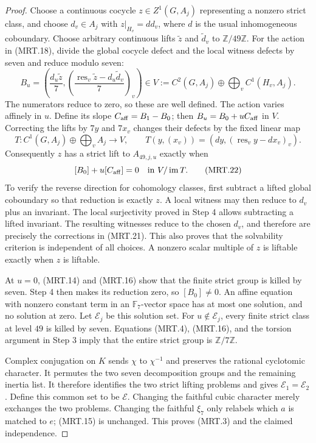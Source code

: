 \begin{proof}
Choose a continuous cocycle $z\in Z^1(G,A_j)$ representing a
nonzero strict class, and choose $d_v\in A_j$ with
$z|_{H_v}=d d_v$, where $d$ is the usual inhomogeneous coboundary.
Choose arbitrary continuous lifts $\widetilde z$ and
$\widetilde d_v$ to $\mathbb Z/49\mathbb Z$.
For the action in (MRT.18), divide the global cocycle defect and
the local witness defects by seven and reduce modulo seven:
\[
 B_u=\left(\frac{d_u\widetilde z}{7},
       \left(\frac{\operatorname{res}_v\widetilde z
                      -d_u\widetilde d_v}{7}\right)_v\right)
       \in V:=C^2(G,A_j)\oplus\bigoplus_v C^1(H_v,A_j).
 \tag{MRT.20}
\]
The numerators reduce to zero, so these are well defined.
The action varies affinely in $u$.  Define its slope
$C_{\rm aff}=B_1-B_0$; then $B_u=B_0+uC_{\rm aff}$ in $V$.
Correcting the lifts by $7y$ and $7x_v$ changes their defects by
the fixed linear map
\[
 T:C^1(G,A_j)\oplus\bigoplus_v A_j\longrightarrow V,
 \qquad T(y,(x_v))=(dy,(\operatorname{res}_v y-dx_v)_v).
 \tag{MRT.21}
\]
Consequently $z$ has a strict lift to $A_{49,j,u}$ exactly when
\[
                   [B_0]+u[C_{\rm aff}]=0\quad\hbox{in }V/\operatorname{im}T.
 \tag{MRT.22}
\]
To verify the reverse direction for cohomology classes, first
subtract a lifted global coboundary so that reduction is exactly
$z$.  A local witness may then reduce to $d_v$ plus an invariant.
The local surjectivity proved in Step 4 allows subtracting a lifted
invariant.  The resulting witnesses reduce to the chosen $d_v$,
and therefore are precisely the corrections in (MRT.21).
This also proves that the solvability criterion is independent of
all choices.  A nonzero scalar multiple of $z$ is liftable exactly
when $z$ is liftable.

At $u=0$, (MRT.14) and (MRT.16) show that the finite strict group
is killed by seven.  Step 4 then makes its reduction zero, so
$[B_0]\ne0$.  An affine equation with nonzero constant term in
an $\mathbb F_7$-vector space has at most one solution, and no
solution at zero.  Let $\mathscr E_j$ be this solution set.
For $u\notin\mathscr E_j$, every finite strict class at level
$49$ is killed by seven.  Equations (MRT.4), (MRT.16), and the
torsion argument in Step 3 imply that the entire strict group
is $\mathbb Z/7\mathbb Z$.

Complex conjugation on $K$ sends $\chi$ to $\chi^{-1}$ and
preserves the rational cyclotomic character.  It permutes the
two seven decomposition groups and the remaining inertia list.
It therefore identifies the two strict lifting problems and
gives $\mathscr E_1=\mathscr E_2$.  Define this common set to be
$\mathscr E$.  Changing the faithful cubic character merely
exchanges the two problems.  Changing the faithful $\xi_7$ only
relabels which $a$ is matched to $e$; (MRT.15) is unchanged.
This proves (MRT.3) and the claimed independence.



\end{proof}
